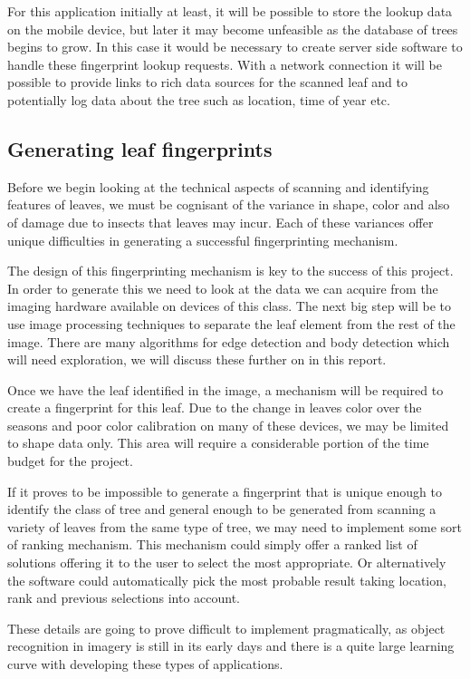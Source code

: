 For this application initially at least, it will be possible to store the lookup data on the mobile device, but later it may become unfeasible as the database of trees begins to grow. In this case it would be necessary to create server side software to handle these fingerprint lookup requests. With a network connection it will be possible to provide links to rich data sources for the scanned leaf and to potentially log data about the tree such as location, time of year etc.

\subsection*{Generating leaf fingerprints}
Before we begin looking at the technical aspects of scanning and identifying features of leaves, we must be cognisant of the variance in shape, color and also of damage due to insects that leaves may incur. Each of these variances offer unique difficulties in generating a successful fingerprinting mechanism.

The design of this fingerprinting mechanism is key to the success of this project. In order to generate this we need to look at the data we can acquire from the imaging hardware available on devices of this class. The next big step will be to use image processing techniques to separate the leaf element from the rest of the image. There are many algorithms for edge detection and body detection which will need exploration, we will discuss these further on in this report.

Once we have the leaf identified in the image, a mechanism will be required to create a fingerprint for this leaf. Due to the change in leaves color over the seasons and poor color calibration on many of these devices, we may be limited to shape data only. This area will require a considerable portion of the time budget for the project.

If it proves to be impossible to generate a fingerprint that is unique enough to identify the class of tree and general enough to be generated from scanning a variety of leaves from the same type of tree, we may need to implement some sort of ranking mechanism. This mechanism could simply offer a ranked list of solutions offering it to the user to select the most appropriate. Or alternatively the software could automatically pick the most probable result taking location, rank and previous selections into account.

These details are going to prove difficult to implement pragmatically, as object recognition in imagery is still in its early days and there is a quite large learning curve with developing these types of applications.

